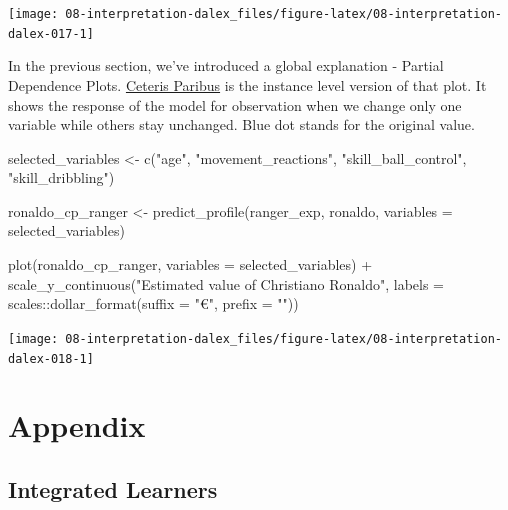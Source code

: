 \documentclass[
]{scrbook}
\newenvironment{Shaded}{\begin{snugshade}}{\end{snugshade}}
\newcommand{\AttributeTok}[1]{\textcolor[rgb]{0.77,0.63,0.00}{#1}}
\newcommand{\FunctionTok}[1]{\textcolor[rgb]{0.00,0.00,0.00}{#1}}
\newcommand{\NormalTok}[1]{#1}
\newcommand{\OtherTok}[1]{\textcolor[rgb]{0.56,0.35,0.01}{#1}}
\newcommand{\SpecialCharTok}[1]{\textcolor[rgb]{0.00,0.00,0.00}{#1}}
\newcommand{\StringTok}[1]{\textcolor[rgb]{0.31,0.60,0.02}{#1}}
\renewenvironment{Shaded} {\begin{snugshade}\small} {\end{snugshade}}
\begin{document}
\begin{center}\texttt{[image: 08-interpretation-dalex\_files/figure-latex/08-interpretation-dalex-017-1]} \end{center}

In the previous section, we've introduced a global explanation - Partial Dependence Plots. \href{https://pbiecek.github.io/ema/ceterisParibus.html}{Ceteris Paribus} is the instance level version of that plot. It shows the response of the model for observation when we change only one variable while others stay unchanged. Blue dot stands for the original value.

\begin{Shaded}
\begin{Highlighting}[]
\NormalTok{selected\_variables }\OtherTok{\textless{}{-}} \FunctionTok{c}\NormalTok{(}\StringTok{"age"}\NormalTok{, }\StringTok{"movement\_reactions"}\NormalTok{,}
                \StringTok{"skill\_ball\_control"}\NormalTok{, }\StringTok{"skill\_dribbling"}\NormalTok{)}

\NormalTok{ronaldo\_cp\_ranger }\OtherTok{\textless{}{-}} \FunctionTok{predict\_profile}\NormalTok{(ranger\_exp, ronaldo, }\AttributeTok{variables =}\NormalTok{ selected\_variables)}

\FunctionTok{plot}\NormalTok{(ronaldo\_cp\_ranger, }\AttributeTok{variables =}\NormalTok{ selected\_variables) }\SpecialCharTok{+}
  \FunctionTok{scale\_y\_continuous}\NormalTok{(}\StringTok{"Estimated value of Christiano Ronaldo"}\NormalTok{, }\AttributeTok{labels =}\NormalTok{ scales}\SpecialCharTok{::}\FunctionTok{dollar\_format}\NormalTok{(}\AttributeTok{suffix =} \StringTok{"€"}\NormalTok{, }\AttributeTok{prefix =} \StringTok{""}\NormalTok{))}
\end{Highlighting}
\end{Shaded}

\begin{center}\texttt{[image: 08-interpretation-dalex\_files/figure-latex/08-interpretation-dalex-018-1]} \end{center}

\hypertarget{appendix}{%
\chapter{Appendix}\label{appendix}}

\hypertarget{list-learners}{%
\section{Integrated Learners}\label{list-learners}}
\end{document}
